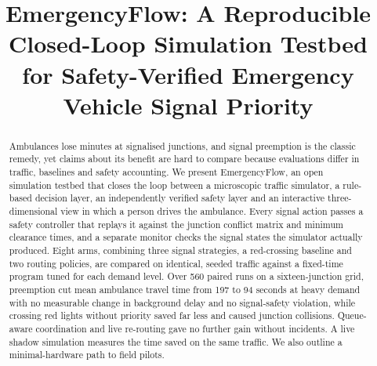 \documentclass[conference]{IEEEtran}
\begin{document}
\title{EmergencyFlow: A Reproducible Closed-Loop Simulation Testbed for Safety-Verified Emergency Vehicle Signal Priority}

\author{
\and
{}
\and
{}
\and
{}
}

\maketitle

\begin{abstract}
Ambulances lose minutes at signalised junctions, and signal preemption is the classic remedy, yet claims about its benefit are hard to compare because evaluations differ in traffic, baselines and safety accounting. We present EmergencyFlow, an open simulation testbed that closes the loop between a microscopic traffic simulator, a rule-based decision layer, an independently verified safety layer and an interactive three-dimensional view in which a person drives the ambulance. Every signal action passes a safety controller that replays it against the junction conflict matrix and minimum clearance times, and a separate monitor checks the signal states the simulator actually produced. Eight arms, combining three signal strategies, a red-crossing baseline and two routing policies, are compared on identical, seeded traffic against a fixed-time program tuned for each demand level. Over 560 paired runs on a sixteen-junction grid, preemption cut mean ambulance travel time from 197 to 94 seconds at heavy demand with no measurable change in background delay and no signal-safety violation, while crossing red lights without priority saved far less and caused junction collisions. Queue-aware coordination and live re-routing gave no further gain without incidents. A live shadow simulation measures the time saved on the same traffic. We also outline a minimal-hardware path to field pilots.
\end{abstract}
\end{document}
